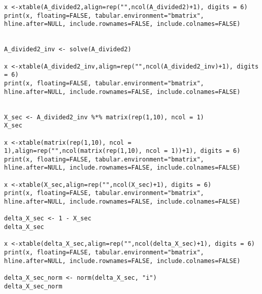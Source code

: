 \documentclass[14pt,a4paper]{scrartcl}
\begin{document}
\begin{lstlisting}
x <-xtable(A_divided2,align=rep("",ncol(A_divided2)+1), digits = 6)
print(x, floating=FALSE, tabular.environment="bmatrix", 
hline.after=NULL, include.rownames=FALSE, include.colnames=FALSE)


A_divided2_inv <- solve(A_divided2)

x <-xtable(A_divided2_inv,align=rep("",ncol(A_divided2_inv)+1), digits = 6)
print(x, floating=FALSE, tabular.environment="bmatrix", 
hline.after=NULL, include.rownames=FALSE, include.colnames=FALSE)


X_sec <- A_divided2_inv %*% matrix(rep(1,10), ncol = 1)
X_sec

x <-xtable(matrix(rep(1,10), ncol = 1),align=rep("",ncol(matrix(rep(1,10), ncol = 1))+1), digits = 6)
print(x, floating=FALSE, tabular.environment="bmatrix", 
hline.after=NULL, include.rownames=FALSE, include.colnames=FALSE)

x <-xtable(X_sec,align=rep("",ncol(X_sec)+1), digits = 6)
print(x, floating=FALSE, tabular.environment="bmatrix", 
hline.after=NULL, include.rownames=FALSE, include.colnames=FALSE)

delta_X_sec <- 1 - X_sec
delta_X_sec

x <-xtable(delta_X_sec,align=rep("",ncol(delta_X_sec)+1), digits = 6)
print(x, floating=FALSE, tabular.environment="bmatrix", 
hline.after=NULL, include.rownames=FALSE, include.colnames=FALSE)

delta_X_sec_norm <- norm(delta_X_sec, "i")
delta_X_sec_norm

\end{lstlisting}
\end{document}
